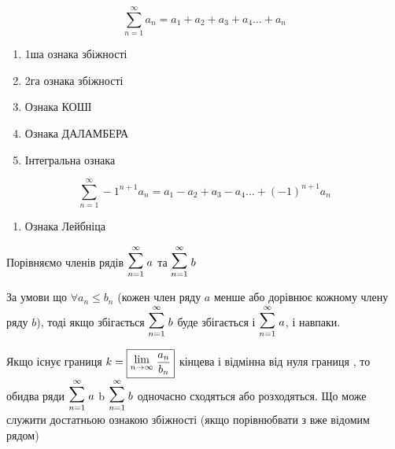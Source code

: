 \begin{multicols}{2}
  $$
  \boxed{ \sum_{n=1}^\infty a_n = a_1 + a_2 + a_3 + a_4 \ldots + a_n }
  $$

  \begin{enumerate}
    \item 1ша ознака збіжності
    \item 2га ознака збіжності
    \item Ознака КОШІ
    \item Ознака ДАЛАМБЕРА
    \item Інтегральна ознака
    \end{enumerate}

  \columnbreak

  $$
  \boxed{ \sum_{n=1}^\infty -1^{n+1}a_n = a_1 - a_2 + a_3 - a_4 \ldots + (-1)^{n+1}a_n }
  $$

  \begin{enumerate}
    \item Ознака Лейбніца
  \end{enumerate}
\end{multicols}

\begin{multicols}{2}

  \begin{center}
    Порівняємо членів рядів $\Sum{n=1}{\infty} a$ та $\Sum{n=1}{\infty} b$

    За умови що $ \boxed{ \forall a_n \leqslant b_n } $ (кожен член ряду $a$ менше або дорівнює кожному члену ряду $b$), тоді якщо збігається $\Sum{n=1}{\infty} b$ буде збігається і $\Sum{n=1}{\infty} a$, і навпаки.
  \end{center}

  \columnbreak


  \begin{center}
  Якщо існує границя $k = \boxed{\Lim{n \to \infty} \dfrac{a_n}{b_n}}$ кінцева і відмінна від нуля границя , то обидва ряди $\Sum{n=1}{\infty} a$ b $\Sum{n=1}{\infty} b$ одночасно сходяться або розходяться. Що може служити достатньою ознакою збіжності (якщо порівнюбвати з вже відомим рядом)
  \end{center}

\end{multicols}
